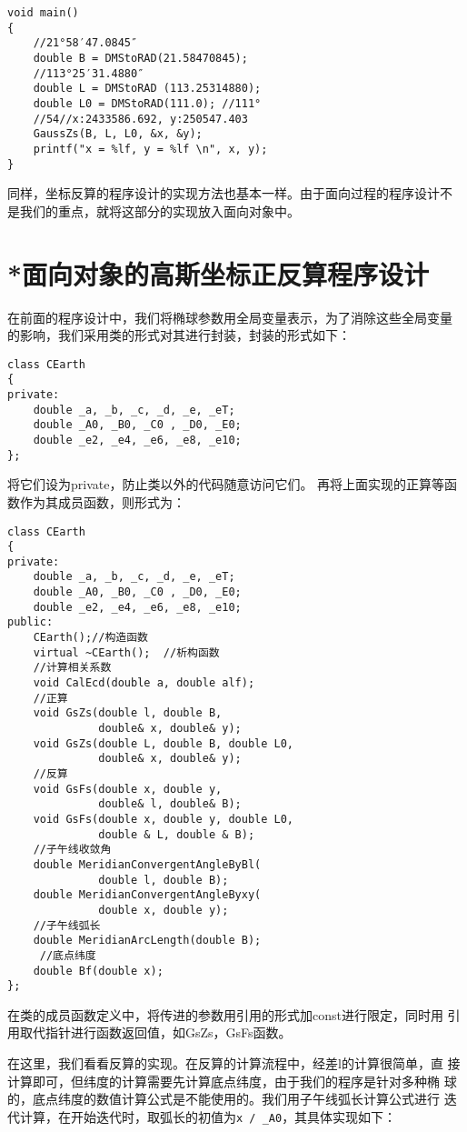\begin{verbatim}
void main()
{
    //21°58′47.0845″
    double B = DMStoRAD(21.58470845);
    //113°25′31.4880″
    double L = DMStoRAD (113.25314880);
    double L0 = DMStoRAD(111.0); //111°
    //54//x:2433586.692, y:250547.403
    GaussZs(B, L, L0, &x, &y);
    printf("x = %lf, y = %lf \n", x, y);
}
\end{verbatim}

同样，坐标反算的程序设计的实现方法也基本一样。由于面向过程的程序设计不
是我们的重点，就将这部分的实现放入面向对象中。

\section{*面向对象的高斯坐标正反算程序设计}
在前面的程序设计中，我们将椭球参数用全局变量表示，为了消除这些全局变量
的影响，我们采用类的形式对其进行封装，封装的形式如下：

\begin{verbatim}
class CEarth
{
private:
    double _a, _b, _c, _d, _e, _eT;
    double _A0, _B0, _C0 , _D0, _E0;
    double _e2, _e4, _e6, _e8, _e10;
};
\end{verbatim}

将它们设为private，防止类以外的代码随意访问它们。
再将上面实现的正算等函数作为其成员函数，则形式为：

\begin{verbatim}
class CEarth
{
private:
    double _a, _b, _c, _d, _e, _eT;
    double _A0, _B0, _C0 , _D0, _E0;
    double _e2, _e4, _e6, _e8, _e10;
public:
    CEarth();//构造函数
    virtual ~CEarth();  //析构函数
    //计算相关系数
    void CalEcd(double a, double alf);
    //正算
    void GsZs(double l, double B,
              double& x, double& y);
    void GsZs(double L, double B, double L0,
              double& x, double& y);
    //反算
    void GsFs(double x, double y,
              double& l, double& B);
    void GsFs(double x, double y, double L0,
              double & L, double & B);
    //子午线收敛角
    double MeridianConvergentAngleByBl(
              double l, double B);
    double MeridianConvergentAngleByxy(
              double x, double y);
    //子午线弧长
    double MeridianArcLength(double B);
     //底点纬度
    double Bf(double x);
};
\end{verbatim}

在类的成员函数定义中，将传进的参数用引用的形式加const进行限定，同时用
引用取代指针进行函数返回值，如GsZs，GsFs函数。

在这里，我们看看反算的实现。在反算的计算流程中，经差l的计算很简单，直
接计算即可，但纬度的计算需要先计算底点纬度，由于我们的程序是针对多种椭
球的，底点纬度的数值计算公式是不能使用的。我们用子午线弧长计算公式进行
迭代计算，在开始迭代时，取弧长的初值为\verb|x / _A0|，其具体实现如下：

